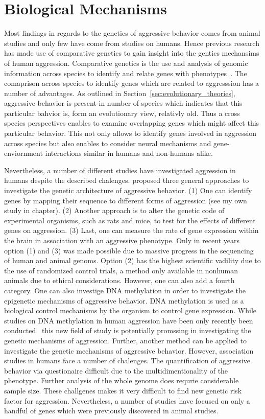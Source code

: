 \section{Biological Mechanisms}
\label{sec:biological_mechanisms}

Most findings in regards to the genetics of aggressive behavior comes from animal studies and only few have come from studies on humans.
Hence previous research has made use of comparative genetics to gain insight into the gentics mechansims of human aggression.
Comparative genetics is the use and analysis of genomic information across species to identify and relate genes with phenotypes~\cite{Maxson2003}.
The comaprison across species to identify genes which are related to aggresssion has a number of advantages.
As outlined in Section~\ref{sec:evolutionary_theories}, aggressive behavior is present in number of species which indicates that this particular bahvior is, form an evolutionary view, relativly old.
Thus a cross species perspectives enables to examine overlapping genes which might affect this particular behavior.
This not only allows to identify genes involved in aggression across species but also enables to consider neural mechanisms and gene-enviornment interactions similar in humans and non-humans alike.

Nevertheless, a number of different studies have investigated aggression in humans despite the described chalenges.
\citet{Maxson2005} proposed three general approaches to investigate the genetic architecture of aggressive behavior.
(1) One can identify genes by mapping their sequence to different forms of aggression (see my own study in chapter). %
(2) Another approach is to alter the genetic code of experimental organisms, such as rats and mice, to test for the effects of different genes on aggression.
(3) Last, one can measure the rate of gene expression within the brain in association with an aggressive phenotype.
Only in recent years option (1) and (3) was made possible due to massive progress in the sequencing of human and animal genoms.
Option (2) has the highest scientific vadility due to the use of randomized control trials, a method only available in nonhuman animals due to ethical considerations.
However, one can also add a fourth category.
One can also investige DNA methylation in order to investigate the epigenetic mechanisms of aggressive behavior.
DNA methylation is used as a biological control mechanisms by the organism to control gene expression.
While studies on DNA methylation in human aggression have been only recently been conducted~\cite{VanDongen2015a} this new field of study is potentially promssing in investigating the genetic mechanisms of aggression.
Further, another method can be applied to investigate the genetic mechanisms of aggressive behavior.
However, association studies in humans face a number of chalenges.
The quantification of aggressive behavior via questionaire difficult due to the multidimentionality of the phenotype.
Further analysis of the whole genome does requrie considerable sample size.
These challgenes makes it very difficult to find new genetic risk factor for aggression.
Nevertheless, a number of studies have focused on only a handful of genes which were previously discovered in animal studies.


